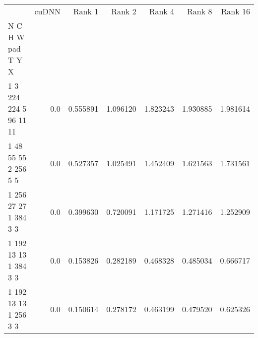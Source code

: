 \begin{tabular}{lrrrrrr}
\toprule
{} &   cuDNN &    Rank 1 &    Rank 2 &    Rank 4 &    Rank 8 &   Rank 16 \\
N C H W pad T Y X      &         &           &           &           &           &           \\
\midrule
1 3 224 224 5 96 11 11 &     0.0 &  0.555891 &  1.096120 &  1.823243 &  1.930885 &  1.981614 \\
1 48 55 55 2 256 5 5   &     0.0 &  0.527357 &  1.025491 &  1.452409 &  1.621563 &  1.731561 \\
1 256 27 27 1 384 3 3  &     0.0 &  0.399630 &  0.720091 &  1.171725 &  1.271416 &  1.252909 \\
1 192 13 13 1 384 3 3  &     0.0 &  0.153826 &  0.282189 &  0.468328 &  0.485034 &  0.666717 \\
1 192 13 13 1 256 3 3  &     0.0 &  0.150614 &  0.278172 &  0.463199 &  0.479520 &  0.625326 \\
\bottomrule
\end{tabular}

